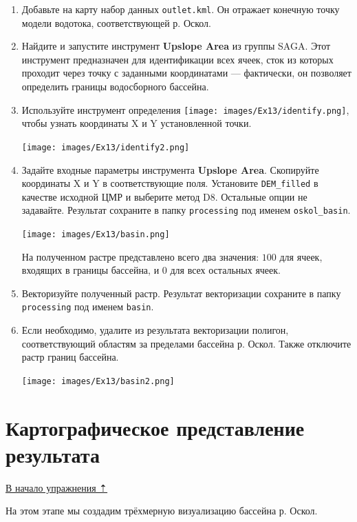 \documentclass[
  12pt,
]{book}
\begin{document}
\begin{enumerate}
\def\labelenumi{\arabic{enumi}.}
\item
  Добавьте на карту набор данных \texttt{outlet.kml}. Он отражает конечную точку модели водотока, соответствующей р. Оскол.
\item
  Найдите и запустите инструмент \textbf{Upslope Area} из группы SAGA. Этот инструмент предназначен для идентификации всех ячеек, сток из которых проходит через точку с заданными координатами --- фактически, он позволяет определить границы водосборного бассейна.
\item
  Используйте инструмент определения \texttt{[image: images/Ex13/identify.png]}, чтобы узнать координаты X и Y установленной точки.

  \texttt{[image: images/Ex13/identify2.png]}
\item
  Задайте входные параметры инструмента \textbf{Upslope Area}. Скопируйте координаты X и Y в соответствующие поля. Установите \texttt{DEM\_filled} в качестве исходной ЦМР и выберите метод D8. Остальные опции не задавайте. Результат сохраните в папку \texttt{processing} под именем \texttt{oskol\_basin}.

  \texttt{[image: images/Ex13/basin.png]}

  На полученном растре представлено всего два значения: \(100\) для ячеек, входящих в границы бассейна, и \(0\) для всех остальных ячеек.
\item
  Векторизуйте полученный растр. Результат векторизации сохраните в папку \texttt{processing} под именем \texttt{basin}.
\item
  Если необходимо, удалите из результата векторизации полигон, соответствующий областям за пределами бассейна р. Оскол. Также отключите растр границ бассейна.

  \texttt{[image: images/Ex13/basin2.png]}
\end{enumerate}

\hypertarget{hydrodem-mapping}{%
\section{Картографическое представление результата}\label{hydrodem-mapping}}

\protect\hyperlink{hydrodem}{В начало упражнения ⇡}

На этом этапе мы создадим трёхмерную визуализацию бассейна р. Оскол.
\end{document}
